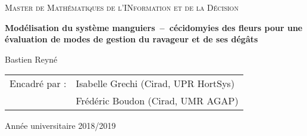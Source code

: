 
\begin{titlingpage}


\vspace*{2.5cm}

\begin{center}
 
 {\large \textsc{Master de Mathématiques de l'INformation et de la Décision}}


 \vspace*{2cm}
 
 
 {\Large \textbf{Modélisation du système manguiers~--~cécidomyies des fleurs pour une évaluation de modes de gestion du ravageur et de ses dégâts}}
 \vspace*{1cm}
 
 Bastien Reyné
 
\end{center}

\vspace*{2cm}

\noindent
\begin{tabular}{ll}
Encadré par : & Isabelle Grechi (Cirad, UPR HortSys)\\
 & Frédéric Boudon (Cirad, UMR AGAP)
\end{tabular}

\vspace*{2cm}

\begin{center}
\end{center}



\vfill

\begin{center}
 Année universitaire 2018/2019
\end{center}


\end{titlingpage}
